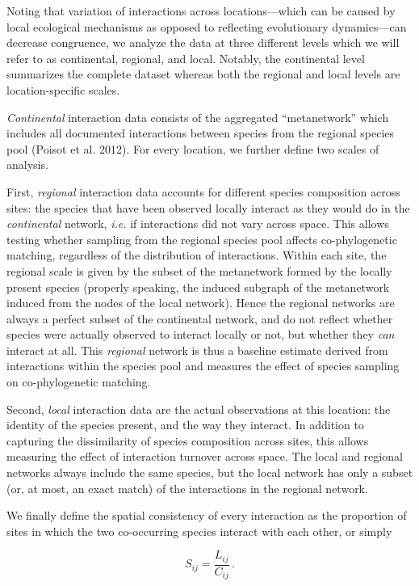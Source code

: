 \documentclass[11pt,serif]{article}
\begin{document}
Noting that variation of interactions across locations---which can be
caused by local ecological mechanisms as opposed to reflecting
evolutionary dynamics---can decrease congruence, we analyze the data at
three different levels which we will refer to as continental, regional,
and local. Notably, the continental level summarizes the complete
dataset whereas both the regional and local levels are location-specific
scales.

\emph{Continental} interaction data consists of the aggregated
``metanetwork'' which includes all documented interactions between
species from the regional species pool (Poisot et al. 2012). For every
location, we further define two scales of analysis.

First, \emph{regional} interaction data accounts for different species
composition across sites: the species that have been observed locally
interact as they would do in the \emph{continental} network, \emph{i.e.}
if interactions did not vary across space. This allows testing whether
sampling from the regional species pool affects co-phylogenetic
matching, regardless of the distribution of interactions. Within each
site, the regional scale is given by the subset of the metanetwork
formed by the locally present species (properly speaking, the induced
subgraph of the metanetwork induced from the nodes of the local
network). Hence the regional networks are always a perfect subset of the
continental network, and do not reflect whether species were actually
observed to interact locally or not, but whether they \emph{can}
interact at all. This \emph{regional} network is thus a baseline
estimate derived from interactions within the species pool and measures
the effect of species sampling on co-phylogenetic matching.

Second, \emph{local} interaction data are the actual observations at
this location: the identity of the species present, and the way they
interact. In addition to capturing the dissimilarity of species
composition across sites, this allows measuring the effect of
interaction turnover across space. The local and regional networks
always include the same species, but the local network has only a subset
(or, at most, an exact match) of the interactions in the regional
network.

We finally define the spatial consistency of every interaction as the
proportion of sites in which the two co-occurring species interact with
each other, or simply

\begin{equation} S_{ij} = \frac{L_{ij}}{C_{ij}}\,. \label{eq:linktunover}\end{equation}
\end{document}
